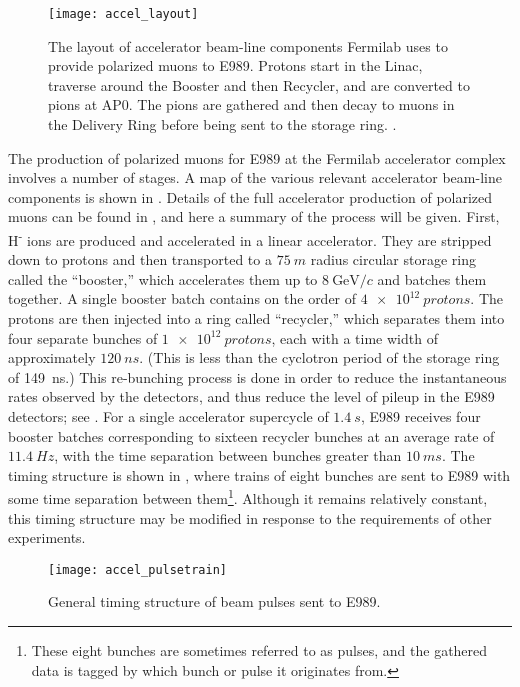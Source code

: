 \begin{figure}
    \centering
    \texttt{[image: accel\_layout]}
    \caption[Fermilab accelerator layout for muon delivery to E989]{The layout of accelerator beam-line components Fermilab uses to provide polarized muons to E989. Protons start in the Linac, traverse around the Booster and then Recycler, and are converted to pions at AP0. The pions are gathered and then decay to muons in the Delivery Ring before being sent to the \gmtwo storage ring. \cite{TDR}.}
    \label{fig:accelerator}
\end{figure}

The production of polarized muons for E989 at the Fermilab accelerator complex involves a number of stages. A map of the various relevant accelerator beam-line components is shown in . Details of the full accelerator production of polarized muons can be found in , and here a summary of the process will be given. First, H\textsuperscript{-} ions are produced and accelerated in a linear accelerator. They are stripped down to protons and then transported to a $\SI{75}{m}$ radius circular storage ring called the ``booster,'' which accelerates them up to $\SI{8}{\GeV/c}$ and batches them together. A single booster batch contains on the order of $\SI{4e12}{protons}$. The protons are then injected into a ring called ``recycler,'' which separates them into four separate bunches of $\SI{1e12}{protons}$, each with a time width of approximately $\SI{120}{ns}$. (This is less than the cyclotron period of the storage ring of \SI{149}{ns}.) This re-bunching process is done in order to reduce the instantaneous rates observed by the detectors, and thus reduce the level of pileup in the E989 detectors; see . For a single accelerator supercycle of $\SI{1.4}{s}$, E989 receives four booster batches corresponding to sixteen recycler bunches at an average rate of $\SI{11.4}{Hz}$, with the time separation between bunches greater than $\SI{10}{ms}$. The timing structure is shown in , where trains of eight bunches are sent to E989 with some time separation between them\footnote{These eight bunches are sometimes referred to as pulses, and the gathered data is tagged by which bunch or pulse it originates from.}. Although it remains relatively constant, this timing structure may be modified in response to the requirements of other experiments.

\begin{figure}
    \centering
    \texttt{[image: accel\_pulsetrain]}
    \caption[Fermilab accelerator pulse train]{General timing structure of beam pulses sent to E989.}   
    \label{fig:pulsetrain}
\end{figure}


